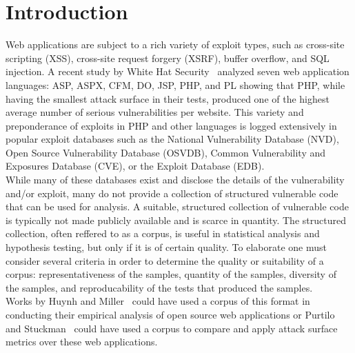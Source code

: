 \documentclass[letterpaper,twocolumn,10pt]{article}
\begin{document}
\section{Introduction}
Web applications are subject to a rich variety of exploit types, such as cross-site scripting (XSS), cross-site request forgery (XSRF), buffer overflow, and SQL injection.  A recent study by White Hat Security~\cite{WhiteHat:2010:Online} analyzed seven web application languages: ASP, ASPX, CFM, DO, JSP, PHP, and PL showing that PHP, while having the smallest attack surface in their tests, produced one of the highest average number of serious vulnerabilities per website.  This variety and preponderance of exploits in PHP and other languages is logged extensively in popular exploit databases such as the National Vulnerability Database (NVD), Open Source Vulnerability Database (OSVDB), Common Vulnerability and Exposures Database (CVE), or the Exploit Database (EDB).\\

While many of these databases exist and disclose the details of the vulnerability and/or exploit, many do not provide a collection of structured vulnerable code that can be used for analysis.  A suitable, structured collection of vulnerable code is typically not made publicly available and is scarce in quantity.  The structured collection, often reffered to as a corpus, is useful in statistical analysis and hypothesis testing, but only if it is of certain quality.  To elaborate one must consider several criteria in order to determine the quality or suitability of a corpus: representativeness of the samples, quantity of the samples, diversity of the samples, and reproducability of the tests that produced the samples.\\

Works by Huynh and Miller~\cite{DBLP:journals/ese/HuynhM10} could have used a corpus of this format in conducting their empirical analysis of open source web applications or Purtilo and Stuckman~\cite{Stuckman:2012:CAA:2372225.2372229} could have used a corpus to compare and apply attack surface metrics over these web applications.\\
\end{document}
